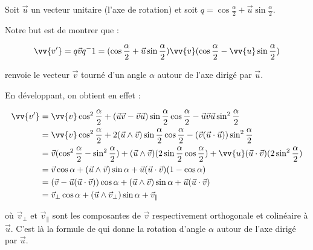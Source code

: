 Soit $\vec{u}$ un vecteur unitaire (l'axe de rotation) et soit 
$q = \cos \frac{\alpha}{2} + \vec{u} \sin \frac{\alpha}{2}$.

Notre but est de montrer que :

\[
	\vv{v'} = q\vec{v}q^-1 = ( \cos \frac{\alpha}{2} + 
	\vec{u} \sin \frac{\alpha}{2} ) \vv{v} ( \cos 
	\frac{\alpha}{2} - \vv{u} \sin \frac{\alpha}{2} )
\]

renvoie le vecteur $\vec{v}$ tourné d'un angle $\alpha$ autour de l'axe
dirigé par $\vec{u}$.

En développant, on obtient en effet :

\begin{align*}
	\vv{v'} & = \vv{v} \coscad + (\vec{u} \vec{v} - \vec{v}\vec{u}) \sinad \cosad- \vec{u}\vec{v}\vec{u}\sincad \\
	& = \vv{v}\coscad + 2 ( \vecsc{u}{v}) \sinad \cosad - (\vec{v}(\vec{u} 
	\cdot \vec{u})) \sincad \\
	& = \vec{v}( \coscad - \sincad ) + (\vecsc{u}{v}) (2 \sinad \cosad) + \vv{u}(\vecpr{u}{v}) (2
	\sincad) \\ 
	& = \vec{v} \cosa + (\vecsc{u}{v}) \sina + \vec{u}(\vecpr{u}{v})( 1 - \cosa ) \\
	& = (\vec{v} - \vec{u}(\vecpr{u}{v})) \cosa + (\vecsc{u}{v}) \sina + \vec{u}(\vecpr{u}{v}) \\
	& = \vec{v}_{\perp} \cosa + (\vecsc{u}{v}_{\perp}) \sina + \vec{v}_{\|}
\end{align*}

où $\vec{v}_{\perp} \text{ et } \vec{v}_{\|}$ sont les composantes de $\vec{v}$ 
respectivement orthogonale et colinéaire à $\vec{u}$. C'est là la formule de 
 qui donne la rotation d'angle $\alpha$ autour de l'axe dirigé par $\vec{u}$.